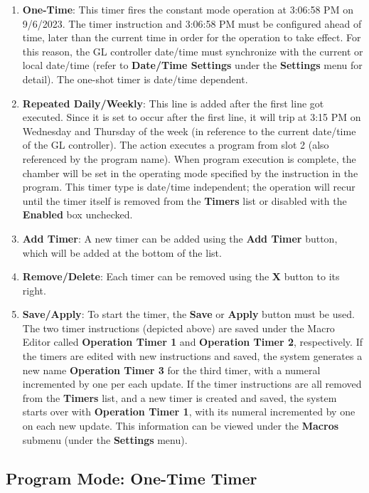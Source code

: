 \begin{enumerate}
\def\labelenumi{\arabic{enumi}.}
\item
  \textbf{One-Time}: This timer fires the constant mode operation at
  3:06:58 PM on 9/6/2023. The timer instruction and 3:06:58 PM must be
  configured ahead of time, later than the current time in order for the
  operation to take effect. For this reason, the GL controller date/time
  must synchronize with the current or local date/time (refer to
  \textbf{Date/Time Settings} under the \textbf{Settings} menu for
  detail). The one-shot timer is date/time dependent.
\item
  \textbf{Repeated Daily/Weekly}: This line is added after the first
  line got executed. Since it is set to occur after the first line, it
  will trip at 3:15 PM on Wednesday and Thursday of the week (in
  reference to the current date/time of the GL controller). The action
  executes a program from slot 2 (also referenced by the program name).
  When program execution is complete, the chamber will be set in the
  operating mode specified by the instruction in the program. This timer
  type is date/time independent; the operation will recur until the
  timer itself is removed from the \textbf{Timers} list or disabled with
  the \textbf{Enabled} box unchecked.
\item
  \textbf{Add Timer}: A new timer can be added using the \textbf{Add
  Timer} button, which will be added at the bottom of the list.
\item
  \textbf{Remove/Delete}: Each timer can be removed using the \textbf{X}
  button to its right.
\item
  \textbf{Save/Apply}: To start the timer, the \textbf{Save} or
  \textbf{Apply} button must be used. The two timer instructions
  (depicted above) are saved under the Macro Editor called
  \textbf{Operation Timer 1} and \textbf{Operation Timer 2},
  respectively. If the timers are edited with new instructions and
  saved, the system generates a new name \textbf{Operation Timer 3} for
  the third timer, with a numeral incremented by one per each update. If
  the timer instructions are all removed from the \textbf{Timers} list,
  and a new timer is created and saved, the system starts over with
  \textbf{Operation Timer 1}, with its numeral incremented by one on
  each new update. This information can be viewed under the
  \textbf{Macros} submenu (under the \textbf{Settings} menu).
\end{enumerate}


\subsection{Program Mode: One-Time
Timer}

